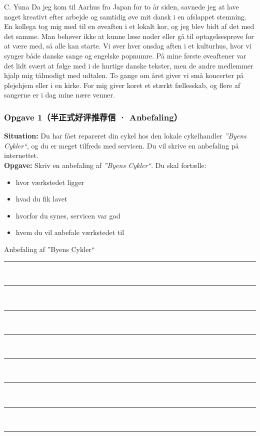 \begin{emailbox}{C. Yuna}
Da jeg kom til Aarhus fra Japan for to år siden, savnede jeg at lave noget kreativt efter arbejde og samtidig øve mit dansk i en afslappet stemning. En kollega tog mig med til en øveaften i et lokalt kor, og jeg blev bidt af det med det samme. Man behøver ikke at kunne læse noder eller gå til optagelsesprøve for at være med, så alle kan starte. Vi øver hver onsdag aften i et kulturhus, hvor vi synger både danske sange og engelske popnumre. På mine første øveaftener var det lidt svært at følge med i de hurtige danske tekster, men de andre medlemmer hjalp mig tålmodigt med udtalen. To gange om året giver vi små koncerter på plejehjem eller i en kirke. For mig giver koret et stærkt fællesskab, og flere af sangerne er i dag mine nære venner.
\end{emailbox}


\subsubsection*{Opgave 1（半正式好评推荐信 · Anbefaling）}

\textbf{Situation:} Du har fået repareret din cykel hos den lokale cykelhandler \textit{”Byens Cykler“}, og du er meget tilfreds med servicen. Du vil skrive en anbefaling på internettet.\\
\textbf{Opgave:} Skriv en anbefaling af \textit{”Byens Cykler“}. Du skal fortælle:
\begin{itemize}
  \item hvor værkstedet ligger
  \item hvad du fik lavet
  \item hvorfor du synes, servicen var god
  \item hvem du vil anbefale værkstedet til
\end{itemize}

\begin{emailbox}{Anbefaling af ”Byens Cykler“}
\vspace{0.25em}
\rule{\linewidth}{0.4pt}\\[0.52em]
\rule{\linewidth}{0.4pt}\\[0.52em]
\rule{\linewidth}{0.4pt}\\[0.52em]
\rule{\linewidth}{0.4pt}\\[0.52em]
\rule{\linewidth}{0.4pt}\\[0.52em]
\rule{\linewidth}{0.4pt}\\[0.52em]
\rule{\linewidth}{0.4pt}\\[0.52em]
\rule{\linewidth}{0.4pt}
\end{emailbox}

